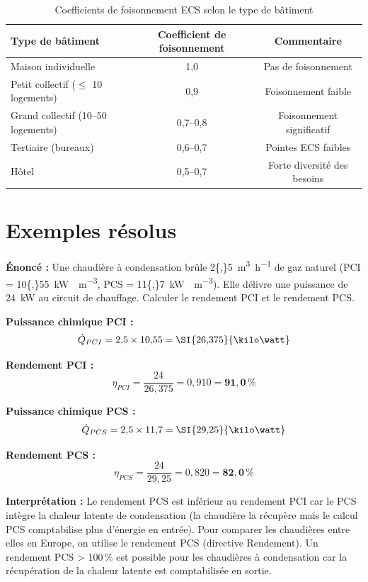 \begin{table}[H]
  \centering
  \caption{Coefficients de foisonnement ECS selon le type de bâtiment}
  \begin{tabular}{lcc}
    \toprule
    Type de bâtiment & Coefficient de foisonnement & Commentaire \\
    \midrule
    Maison individuelle & 1,0 & Pas de foisonnement \\
    Petit collectif ($\leq$ 10 logements) & 0,9 & Foisonnement faible \\
    Grand collectif (10–50 logements) & 0,7–0,8 & Foisonnement significatif \\
    Tertiaire (bureaux) & 0,6–0,7 & Pointes ECS faibles \\
    Hôtel & 0,5–0,7 & Forte diversité des besoins \\
    \bottomrule
  \end{tabular}
\end{table}

\section{Exemples résolus}

\begin{exemple}[title=Rendement d'une chaudière à condensation — PCI et PCS]
\textbf{Énoncé :} Une chaudière à condensation brûle \SI{2{,}5}{\cubic\metre\per\hour} de gaz naturel (PCI = \SI{10{,}55}{\kilo\watt\heure\per\cubic\metre}, PCS = \SI{11{,}7}{\kilo\watt\heure\per\cubic\metre}). Elle délivre une puissance de \SI{24}{\kilo\watt} au circuit de chauffage. Calculer le rendement PCI et le rendement PCS.

\textbf{Puissance chimique PCI :}
\[
  \dot{Q}_{PCI} = 2{,}5 \times 10{,}55 = \SI{26{,}375}{\kilo\watt}
\]

\textbf{Rendement PCI :}
\[
  \eta_{PCI} = \frac{24}{26{,}375} = 0{,}910 = \mathbf{91{,}0\,\%}
\]

\textbf{Puissance chimique PCS :}
\[
  \dot{Q}_{PCS} = 2{,}5 \times 11{,}7 = \SI{29{,}25}{\kilo\watt}
\]

\textbf{Rendement PCS :}
\[
  \eta_{PCS} = \frac{24}{29{,}25} = 0{,}820 = \mathbf{82{,}0\,\%}
\]

\textbf{Interprétation :} Le rendement PCS est inférieur au rendement PCI car le PCS intègre la chaleur latente de condensation (la chaudière la récupère mais le calcul PCS comptabilise plus d'énergie en entrée). Pour comparer les chaudières entre elles en Europe, on utilise le rendement PCS (directive Rendement). Un rendement PCS > 100\,\% est possible pour les chaudières à condensation car la récupération de la chaleur latente est comptabilisée en sortie.
\end{exemple}

